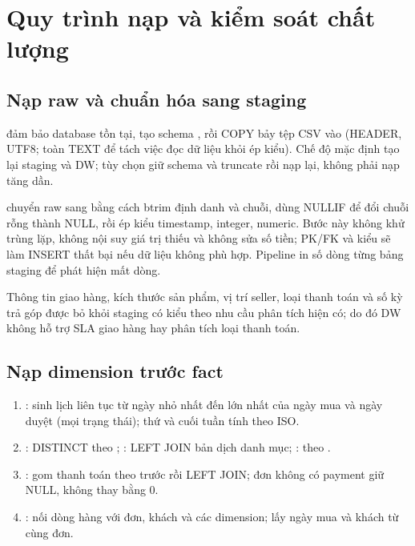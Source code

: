 \section{Quy trình nạp và kiểm soát chất lượng}
\subsection{Nạp raw và chuẩn hóa sang staging}
 đảm bảo database tồn tại, tạo schema , rồi COPY bảy tệp CSV vào  (HEADER, UTF8; toàn TEXT để tách việc đọc dữ liệu khỏi ép kiểu). Chế độ mặc định tạo lại staging và DW; tùy chọn  giữ schema và truncate rồi nạp lại, không phải nạp tăng dần.

 chuyển raw sang  bằng cách btrim định danh và chuỗi, dùng NULLIF để đổi chuỗi rỗng thành NULL, rồi ép kiểu timestamp, integer, numeric. Bước này không khử trùng lặp, không nội suy giá trị thiếu và không sửa số tiền; PK/FK và kiểu sẽ làm INSERT thất bại nếu dữ liệu không phù hợp. Pipeline in số dòng từng bảng staging để phát hiện mất dòng.

Thông tin giao hàng, kích thước sản phẩm, vị trí seller, loại thanh toán và số kỳ trả góp được bỏ khỏi staging có kiểu theo nhu cầu phân tích hiện có; do đó DW không hỗ trợ SLA giao hàng hay phân tích loại thanh toán.

\subsection{Nạp dimension trước fact}
\begin{enumerate}[leftmargin=*]
\item {}: sinh lịch liên tục từ ngày nhỏ nhất đến lớn nhất của ngày mua và ngày duyệt (mọi trạng thái); thứ và cuối tuần tính theo ISO.
\item {}: DISTINCT theo ; : LEFT JOIN bản dịch danh mục; : theo .
\item {}: gom thanh toán theo  trước rồi LEFT JOIN; đơn không có payment giữ NULL, không thay bằng 0.
\item {}: nối dòng hàng với đơn, khách và các dimension; lấy ngày mua và khách từ cùng đơn.
\end{enumerate}

